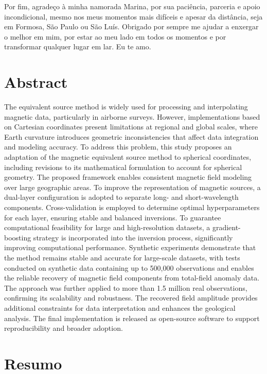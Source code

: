 \documentclass[a4paper,oneside,10pt]{book}
\begin{document}
Por fim, agradeço à minha namorada Marina, por sua paciência, parceria e
apoio incondicional, mesmo nos meus momentos mais difíceis e apesar da
distância, seja em Formosa, São Paulo ou São Luís. Obrigado por sempre me
ajudar a enxergar o melhor em mim, por estar ao meu lado em todos os
momentos e por transformar qualquer lugar em lar. Eu te amo.

\newpage
\section*{Abstract}

The equivalent source method is widely used for processing and
interpolating magnetic data, particularly in airborne surveys. However,
implementations based on Cartesian coordinates present limitations at
regional and global scales, where Earth curvature introduces geometric
inconsistencies that affect data integration and modeling accuracy. To
address this problem, this study proposes an adaptation of the magnetic
equivalent source method to spherical coordinates, including revisions
to its mathematical formulation to account for spherical geometry. The
proposed framework enables consistent magnetic field modeling over large
geographic areas.
To improve the representation of magnetic sources, a dual-layer
configuration is adopted to separate long- and short-wavelength
components. Cross-validation is employed to determine optimal
hyperparameters for each layer, ensuring stable and balanced inversions.
To guarantee computational feasibility for large and high-resolution
datasets, a gradient-boosting strategy is incorporated into the inversion
process, significantly improving computational performance.
Synthetic experiments demonstrate that the method remains stable and accurate for large-scale datasets,
with tests conducted on synthetic data containing up to 500,000 observations and enables
the reliable recovery of magnetic field components from total-field
anomaly data. The approach was further applied to more than 1.5 million
real observations, confirming its scalability and robustness. The
recovered field amplitude provides additional constraints for data
interpretation and enhances the geological analysis.
The final implementation is released as open-source software to support
reproducibility and broader adoption.

\newpage
\section*{Resumo}
\end{document}
